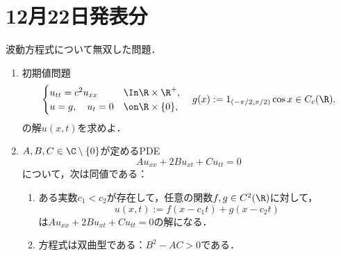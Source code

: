 \documentclass[uplatex,dvipdfmx]{jsarticle}
\begin{document}
\section{12月22日発表分}

\begin{tcolorbox}[colframe=ForestGreen, colback=ForestGreen!10!white,breakable,colbacktitle=ForestGreen!40!white,coltitle=black,fonttitle=\bfseries\sffamily,
title=]
    波動方程式について無双した問題．
\end{tcolorbox}

\begin{problem}\mbox{}
    \begin{enumerate}
        \item 初期値問題
        \[\begin{cases}
            u_{tt}=c^2u_{xx}&\In\R\times\R^+,\\
            u=g,\quad u_t=0&\on\R\times\{0\},
        \end{cases}\quad g(x):=1_{(-\pi/2,\pi/2)}\cos x\in C_c(\R).\]
        の解$u(x,t)$を求めよ．
        \item $A,B,C\in\C\setminus\{0\}$が定めるPDE
        \[Au_{xx}+2Bu_{xt}+Cu_{tt}=0\]
        について，次は同値である：
        \begin{enumerate}
            \item ある実数$c_1<c_2$が存在して，任意の関数$f,g\in C^2(\R)$に対して，
            \[u(x,t):=f(x-c_1t)+g(x-c_2t)\]
            は$Au_{xx}+2Bu_{xt}+Cu_{tt}=0$の解になる．
            \item 方程式は双曲型である：$B^2-AC>0$である．
        \end{enumerate}
    \end{enumerate}
\end{problem}
\end{document}

